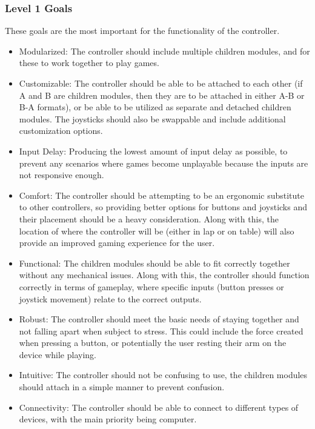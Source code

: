 \documentclass[a4]{article}
\begin{document}
\subsubsection{Level 1 Goals}
These goals are the most important for the functionality of the controller.
\begin{itemize}
    \item \textcolor{McMasterMaroon}{Modularized}: The controller should include multiple children modules, and for these to work together to play games.
    \item \textcolor{McMasterMaroon}{Customizable}: The controller should be able to be attached to each other (if A and B are children modules, then they are to be attached in either A-B or B-A formats), or be able to be utilized as separate and detached children modules.
        The joysticks should also be swappable and include additional customization options.
    \item \textcolor{McMasterMaroon}{Input Delay}: Producing the lowest amount of input delay as possible, to prevent any scenarios where games become unplayable because the inputs are not responsive enough.
    \item \textcolor{McMasterMaroon}{Comfort}: The controller should be attempting to be an ergonomic substitute to other controllers, so providing better options for buttons and joysticks and their placement should be a heavy consideration. 
        Along with this, the location of where the controller will be (either in lap or on table) will also provide an improved gaming experience for the user.
    \item \textcolor{McMasterMaroon}{Functional}: The children modules should be able to fit correctly together without any mechanical issues. Along with this, the controller should function correctly in terms of gameplay, where specific inputs (button presses or joystick movement) relate to the correct outputs.
    \item \textcolor{McMasterMaroon}{Robust}: The controller should meet the basic needs of staying together and not falling apart when subject to stress. This could include the force created when pressing a button, or potentially the user resting their arm on the device while playing.
    \item \textcolor{McMasterMaroon}{Intuitive}: The controller should not be confusing to use, the children modules should attach in a simple manner to prevent confusion.
    \item \textcolor{McMasterMaroon}{Connectivity}: The controller should be able to connect to different types of devices, with the main priority being computer.   
\end{itemize}
\end{document}
